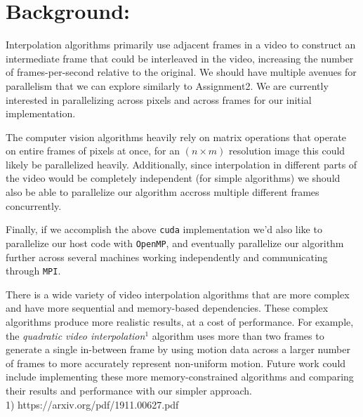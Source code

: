 \documentclass[12pt]{article}
\begin{document}
\section*{Background:}
\par Interpolation algorithms primarily use adjacent frames in a video to construct an intermediate frame that could be interleaved in the video, increasing the number of frames-per-second relative to the original. We should have multiple avenues for parallelism that we can explore similarly to Assignment2. We are currently interested in parallelizing across pixels and across frames for our initial implementation. 
\par The computer vision algorithms heavily rely on matrix operations that operate on entire frames of pixels at once, for an $(n \times m)$ resolution image this could likely be parallelized heavily. Additionally, since interpolation in different parts of the video would be completely independent (for simple algorithms) we should also be able to parallelize our algorithm accross multiple different frames concurrently.
\par Finally, if we accomplish the above \texttt{cuda} implementation we'd also like to parallelize our host code with \texttt{OpenMP}, and eventually parallelize our algorithm further across several machines working independently and communicating through \texttt{MPI}.
\par There is a wide variety of video interpolation algorithms that are more complex and have more sequential and memory-based dependencies. These complex algorithms produce more realistic results, at a cost of performance. For example, the \textit{quadratic video interpolation}$^1$ algorithm uses more than two frames to generate a single in-between frame by using motion data across a larger number of frames to more accurately represent non-uniform motion. Future work could include implementing these more memory-constrained algorithms and comparing their results and performance with our simpler approach.
$~$\\
1) https://arxiv.org/pdf/1911.00627.pdf

\newpage
\end{document}
